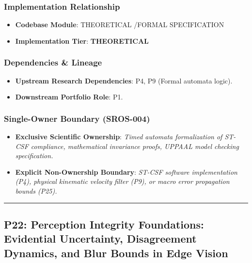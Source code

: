 \documentclass[11pt,letterpaper]{article}
\begin{document}
\subsubsection{Implementation Relationship}
\begin{itemize}[leftmargin=*]
    \item \raggedright \textbf{Codebase Module}: THEORETICAL /\allowbreak  FORMAL SPECIFICATION
    \item \textbf{Implementation Tier}: \textbf{THEORETICAL}
\end{itemize}

\subsubsection{Dependencies \& Lineage}
\begin{itemize}[leftmargin=*]
    \item \textbf{Upstream Research Dependencies}: P4, P9 (Formal automata logic).
    \item \textbf{Downstream Portfolio Role}: P1.
\end{itemize}

\subsubsection{Single-Owner Boundary (SROS-004)}
\begin{itemize}[leftmargin=*]
    \item \textbf{Exclusive Scientific Ownership}: \textit{Timed automata formalization of ST-\allowbreak CSF compliance, mathematical invariance proofs, UPPAAL model checking specification.}
    \item \textbf{Explicit Non-Ownership Boundary}: \textit{ST-\allowbreak CSF software implementation (P4), physical kinematic velocity filter (P9), or macro error propagation bounds (P25).}
\end{itemize}

\vspace{0.4cm}
\hrule

\subsection{P22: Perception Integrity Foundations: Evidential Uncertainty, Disagreement Dynamics, and Blur Bounds in Edge Vision}
\label{sec:profile_p22}
\end{document}
